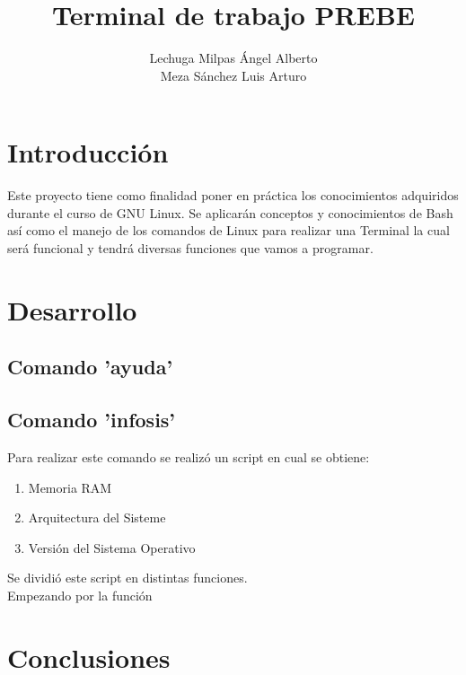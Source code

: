 \documentclass[titlepage]{article}
\title{Terminal de trabajo PREBE}
\author{Lechuga Milpas Ángel Alberto \\ Meza Sánchez Luis Arturo }
\begin{document}
\maketitle

\tableofcontents
\newpage

\section{Introducción}
Este proyecto tiene como finalidad poner en práctica los conocimientos adquiridos durante el curso de GNU Linux. Se aplicarán conceptos y conocimientos de Bash así como el manejo de los comandos de Linux para realizar una Terminal la cual será funcional y tendrá diversas funciones que vamos a programar.
\section{Desarrollo}
\subsection{Comando 'ayuda'}

\subsection{Comando 'infosis'}
Para realizar este comando se realizó un script en cual se obtiene:
\begin{enumerate}
    \item Memoria RAM
    \item Arquitectura del Sisteme
    \item Versión del Sistema Operativo
\end{enumerate}
Se dividió este script en distintas funciones.\\
Empezando por la función 

\section{Conclusiones}
\end{document}
